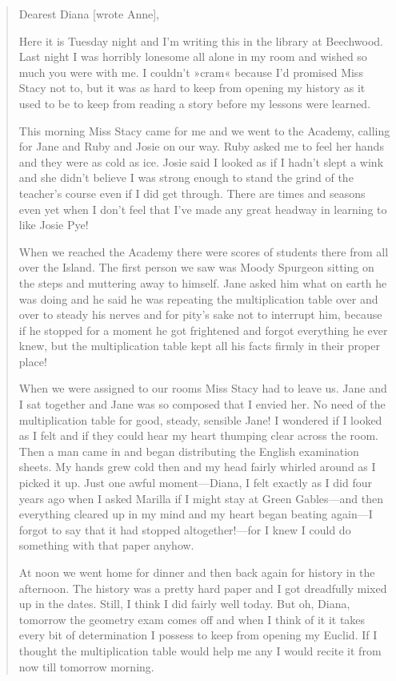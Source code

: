 \begin{quotation}
\noindent Dearest Diana [wrote Anne],

Here it is Tuesday night and I'm writing this in the library at Beechwood. Last night I was horribly lonesome all alone in my room and wished so much you were with me. I couldn't »cram« because I'd promised Miss Stacy not to, but it was as hard to keep from opening my history as it used to be to keep from reading a story before my lessons were learned.

This morning Miss Stacy came for me and we went to the Academy, calling for Jane and Ruby and Josie on our way. Ruby asked me to feel her hands and they were as cold as ice. Josie said I looked as if I hadn't slept a wink and she didn't believe I was strong enough to stand the grind of the teacher's course even if I did get through. There are times and seasons even yet when I don't feel that I've made any great headway in learning to like Josie Pye!

When we reached the Academy there were scores of students there from all over the Island. The first person we saw was Moody Spurgeon sitting on the steps and muttering away to himself. Jane asked him what on earth he was doing and he said he was repeating the multiplication table over and over to steady his nerves and for pity's sake not to interrupt him, because if he stopped for a moment he got frightened and forgot everything he ever knew, but the multiplication table kept all his facts firmly in their proper place!

When we were assigned to our rooms Miss Stacy had to leave us. Jane and I sat together and Jane was so composed that I envied her. No need of the multiplication table for good, steady, sensible Jane! I wondered if I looked as I felt and if they could hear my heart thumping clear across the room. Then a man came in and began distributing the English examination sheets. My hands grew cold then and my head fairly whirled around as I picked it up. Just one awful moment—Diana, I felt exactly as I did four years ago when I asked Marilla if I might stay at Green Gables—and then everything cleared up in my mind and my heart began beating again—I forgot to say that it had stopped altogether!—for I knew I could do something with that paper anyhow.

At noon we went home for dinner and then back again for history in the afternoon. The history was a pretty hard paper and I got dreadfully mixed up in the dates. Still, I think I did fairly well today. But oh, Diana, tomorrow the geometry exam comes off and when I think of it it takes every bit of determination I possess to keep from opening my Euclid. If I thought the multiplication table would help me any I would recite it from now till tomorrow morning.


\end{quotation}
